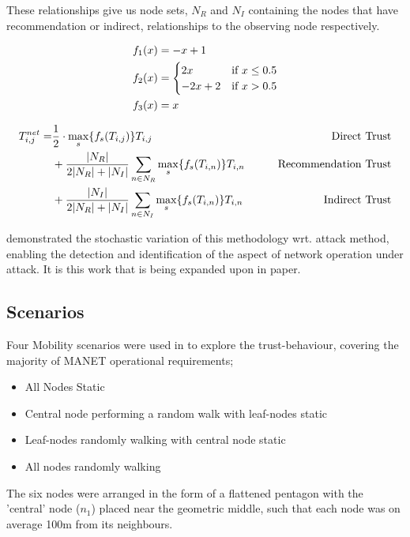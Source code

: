 \documentclass[runningheads,a4paper]{llncs}
\begin{document}
These relationships give us node sets, $N_R$ and $N_I$ containing the nodes that have recommendation or indirect, relationships to the observing node respectively.

\begin{align}
  \label{eq:whitenization}
  f_1(x) &= -x+1\notag\\
  f_2(x) &= 
  \begin{cases}
    2x & \text{if }x\leq 0.5\\
    -2x+2 & \text{if }x>0.5
  \end{cases}\\
  f_3(x) &= x\notag
\end{align}

\begin{align}
  \label{eq:networkeffects}
  T_{i,j}^{net}=&\frac{1}{2} \cdot \max_s\{f_s(T_{i,j})\} T_{i,j}&\qquad \text{Direct Trust}\notag \\
  &+ \frac{|N_R| }{2|N_R| + |N_I|}\sum_{n \in N_R} \max_s\{f_s(T_{i,n})\} T_{i,n}&\qquad \text{Recommendation Trust}\notag\\
  &+ \frac{|N_I| }{2|N_R| + |N_I|}\sum_{n \in N_I} \max_s\{f_s(T_{i,n})\} T_{i,n} &\qquad \text{Indirect Trust}
\end{align}

\cite{Guo11} demonstrated the stochastic variation of this methodology wrt. attack method, enabling the detection and identification of the aspect of network operation under attack.
It is this work that is being expanded upon in paper.

\subsection{Scenarios}

Four Mobility scenarios were used in \cite{Guo11} to explore the trust-behaviour, covering the majority of MANET operational requirements; 

\begin{itemize}
  \item All Nodes Static
  \item Central node performing a random walk with leaf-nodes static
  \item Leaf-nodes randomly walking with central node static
  \item All nodes randomly walking
\end{itemize}

The six nodes were arranged in the form of a flattened pentagon with the 'central' node ($n_1$) placed near the geometric middle, such that each node was on average 100m from its neighbours.
\end{document}
